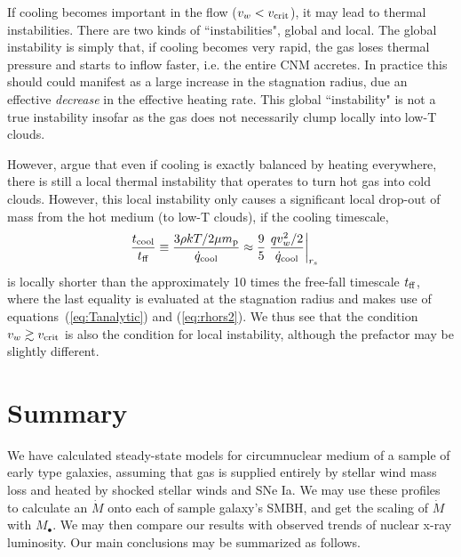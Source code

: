 \documentclass[usenatbib,fleqn]{mn2e}
\newcommand{\Mdot}{\dot{M}}
\newcommand{\rs}{r_s}
\newcommand{\vw}{v_w}
\renewcommand{\mp}{m_{\rm p}}
\newcommand{\Mbh}[1][]{M_{\bullet#1}}
\newcommand{\tcool}{t_{\rm cool}}
\newcommand{\tff}{t_{\rm ff}}
\begin{document}
If cooling becomes important in the flow ($v_{w} < v_{\rm crit}$), it may lead to thermal instabilities.  There are two kinds of ``instabilities", global and local.  The global instability is simply that, if cooling becomes very rapid, the gas loses thermal pressure and starts to inflow faster, i.e. the entire CNM accretes.  In
practice this should could manifest as a large increase in the stagnation radius, due an effective {\it decrease} in the effective heating rate.  This global ``instability" is not a true instability insofar as the gas does not necessarily clump locally into low-T clouds.

However, \citet{McCourt+12} argue that even if cooling is exactly
balanced by heating everywhere, there is still a local thermal
instability that operates to turn hot gas into cold clouds.  However,
this local instability only causes a significant local drop-out of
mass from the hot medium (to low-T clouds), if the cooling timescale,
\begin{align}
\frac{\tcool}{\tff} &\equiv \frac{3\rho k T/2 \mu \mp}{\dot{q}_{\rm cool}} \approx \frac{9}{5} \left. \frac{q \vw^2/2}{\dot{q}_{\rm cool}}\right|_{\rs}
\end{align} 
is locally shorter than the approximately 10 times the free-fall
timescale $t_{\rm ff}$, where the last equality is evaluated at the
stagnation radius and makes use of equations~(\ref{eq:Tanalytic}) and
(\ref{eq:rhors2}).  We thus see that the condition $v_w \gtrsim v_{\rm
  crit}$ is also the condition for local instability, although the
prefactor may be slightly different.


  \section{Summary}
  \label{sec:summary}
  We have calculated steady-state models for circumnuclear medium of a
  sample of early type galaxies, assuming that gas is supplied
  entirely by stellar wind mass loss and heated by shocked stellar
  winds and SNe Ia. We may use these profiles to calculate an $\Mdot$
  onto each of sample galaxy's SMBH, and get the scaling of $\Mdot$
  with $\Mbh$. We may then compare our results with observed trends of
  nuclear x-ray luminosity. Our main conclusions may be summarized as
  follows.
\end{document}
